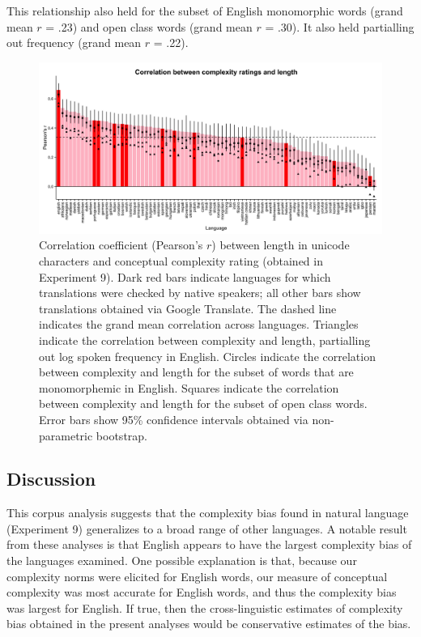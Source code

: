 \documentclass[man]{apa2}
\begin{document}
This relationship also held for the subset of English monomorphic words (grand mean $r$ = .23) and open class words (grand mean $r$ = .30). It also held partialling out frequency (grand mean $r$ = .22). 

 \begin{figure} 
 \begin{center} 
  \includegraphics[width=6.3in]{figures/xling_plot.png} 
  \caption{\label{fig:study4a_plasd} Correlation coefficient (Pearson's $r$) between length in unicode characters and conceptual complexity rating (obtained in Experiment 9). Dark red bars indicate languages for which translations were checked by native speakers; all other bars show translations obtained via Google Translate. The dashed line indicates the grand mean correlation across languages. Triangles indicate the correlation between complexity and length, partialling out log spoken frequency in English. Circles indicate the correlation between complexity and length for the subset of words that are monomorphemic in English. Squares indicate the correlation between complexity and length for the subset of open class words. Error bars show 95\% confidence intervals obtained via non-parametric bootstrap. } 
 \end{center} 
\end{figure}	


\subsection{Discussion}

This corpus analysis suggests that the complexity bias found in natural language (Experiment 9) generalizes to a broad range of other languages. A notable result from these analyses is that English appears to have the largest complexity bias of the languages examined. One possible explanation is that, because our complexity norms were elicited for English words, our measure of conceptual complexity was most accurate for English words, and thus the complexity bias was largest for English. If true, then the cross-linguistic estimates of complexity bias obtained in the present analyses would be conservative estimates of the bias. 
\end{document}
